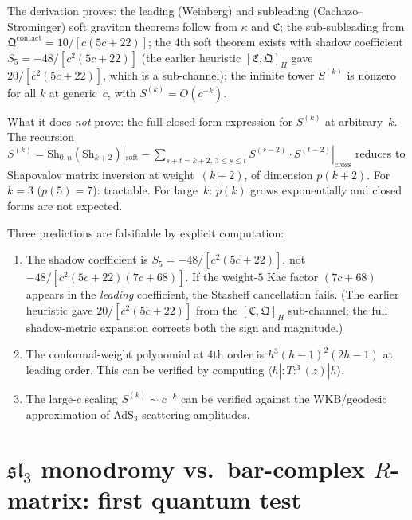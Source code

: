 \documentclass[11pt]{article}
\newcommand{\fsl}{\mathfrak{sl}}
\begin{document}
\begin{remark}
The derivation proves: the leading (Weinberg) and subleading (Cachazo--Strominger) soft graviton theorems follow from $\kappa$ and $\mathfrak{C}$; the sub-subleading from $\mathfrak{Q}^{\mathrm{contact}} = 10/[c(5c+22)]$; the 4th soft theorem exists with shadow coefficient $S_5 = -48/[c^2(5c+22)]$ (the earlier heuristic $[\mathfrak{C},\mathfrak{Q}]_H$ gave $20/[c^2(5c+22)]$, which is a sub-channel); the infinite tower $S^{(k)}$ is nonzero for all $k$ at generic~$c$, with $S^{(k)} = O(c^{-k})$.

What it does \emph{not} prove: the full closed-form expression for $S^{(k)}$ at arbitrary~$k$.  The recursion $S^{(k)} = \mathrm{Sh}_{0,n}(\mathrm{Sh}_{k+2})|_{\mathrm{soft}} - \sum_{s+t = k+2,\, 3 \le s \le t} S^{(s-2)} \cdot S^{(t-2)}|_{\mathrm{cross}}$ reduces to Shapovalov matrix inversion at weight~$(k+2)$, of dimension $p(k+2)$.  For $k = 3$ ($p(5) = 7$): tractable.  For large~$k$: $p(k)$ grows exponentially and closed forms are not expected.
\end{remark}

\begin{remark}
Three predictions are falsifiable by explicit computation:
\begin{enumerate}
\item The shadow coefficient is $S_5 = -48/[c^2(5c+22)]$, not $-48/[c^2(5c+22)(7c+68)]$.  If the weight-$5$ Kac factor $(7c+68)$ appears in the \emph{leading} coefficient, the Stasheff cancellation fails.  (The earlier heuristic gave $20/[c^2(5c+22)]$ from the $[\mathfrak{C},\mathfrak{Q}]_H$ sub-channel; the full shadow-metric expansion corrects both the sign and magnitude.)
\item The conformal-weight polynomial at 4th order is $h^3(h-1)^2(2h-1)$ at leading order.  This can be verified by computing $\langle h | {:}T{:}^3(z) | h \rangle$.
\item The large-$c$ scaling $S^{(k)} \sim c^{-k}$ can be verified against the WKB/geodesic approximation of AdS$_3$ scattering amplitudes.
\end{enumerate}
\end{remark}


\section{$\fsl_3$ monodromy vs.\ bar-complex $R$-matrix: first quantum test}
\label{sec:sl3-monodromy-test}
\end{document}
